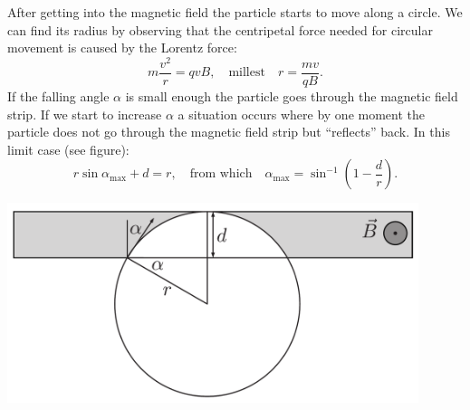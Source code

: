 \solueng
After getting into the magnetic field the particle starts to move along a circle. We can find its radius by observing that the centripetal force needed for circular movement is caused by the Lorentz force:
\[m\frac{v^2}{r}=qvB, \quad \text{millest} \quad r=\frac{mv}{qB}.\]
If the falling angle $\alpha$ is small enough the particle goes through the magnetic field strip. If we start to increase $\alpha$ a situation occurs where by one moment the particle does not go through the magnetic field strip but “reflects” back. In this limit case (see figure):
\[r\sin\alpha_\text{max}+d=r, \quad \text{from which} \quad \alpha_\text{max}=\sin^{-1}\left(1-\frac{d}{r}\right).\]
\begin{center}
\includegraphics[width=0.9\textwidth]{2013-lahg-02-magPeegLah}
\end{center}
\probend
